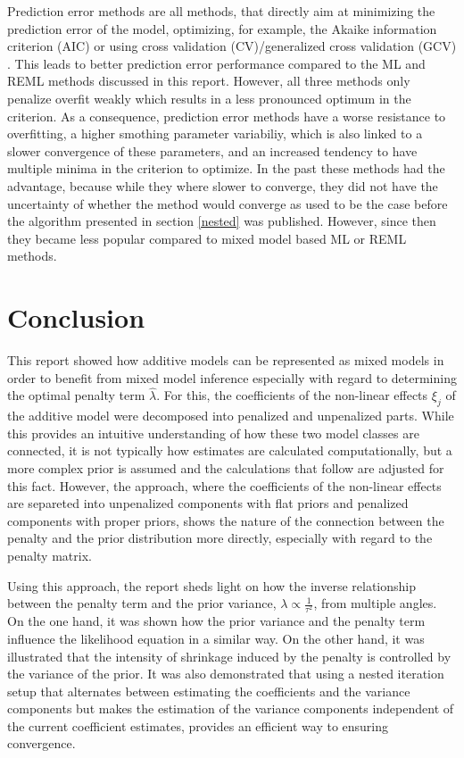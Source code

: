 \documentclass[12pt]{article}
\begin{document}
Prediction error methods are all methods, that directly aim at minimizing the prediction error of the model, optimizing, for example, the Akaike information criterion (AIC) or using cross validation (CV)/generalized cross validation (GCV) \cite{wood2011fast}. This leads to better prediction error performance compared to the ML and REML methods discussed in this report. However, all three methods only penalize overfit weakly which results in a less pronounced optimum in the criterion. As a consequence, prediction error methods have a worse resistance to overfitting, a higher smothing parameter variabiliy, which is also linked to a slower convergence of these parameters, and an increased tendency to have multiple minima in the criterion to optimize. In the past these methods had the advantage, because while they where slower to converge, they did not have the uncertainty of whether the method would converge as used to be the case before the algorithm presented in section \ref{nested} was published. However, since then they became less popular compared to mixed model based ML or REML methods.


\section{Conclusion} %

This report showed how additive models can be represented as mixed models in order to benefit from mixed model inference especially with regard to determining the optimal penalty term $\hat{\lambda}$.
For this, the coefficients of the non-linear effects $\xi_j$ of the additive model were decomposed into penalized and unpenalized parts. While this provides an intuitive understanding of how these two model classes are 
connected, it is not typically how estimates are calculated computationally, but a more complex prior is assumed and the calculations that follow are adjusted for this fact. However, the approach, where the coefficients of the non-linear effects are separeted into unpenalized components with flat priors and penalized components with proper priors, shows the nature of the connection between the penalty and the prior distribution more directly, especially with regard to the penalty matrix.

Using this approach, the report sheds light on how the inverse relationship between the penalty term and the prior variance, $\lambda \propto \frac{1}{\tau^2}$, from multiple angles. On the one hand, it was shown how the prior variance and the penalty term influence the likelihood equation in a similar way. On the other hand, it was illustrated that the intensity of shrinkage induced by the penalty is controlled by the variance of the prior. It was also demonstrated that using a nested iteration setup that alternates between estimating the coefficients and the variance components but makes the estimation of the variance components independent of the current coefficient estimates, provides an efficient way to ensuring convergence.
\end{document}
